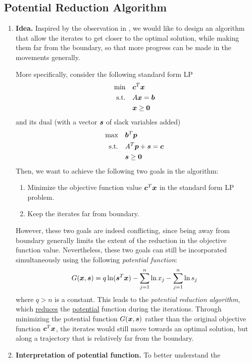 \subsection{Potential Reduction Algorithm}
\begin{enumerate}
\item \textbf{Idea.} Inspired by the observation in
, we would like to design an algorithm
that allow the iterates to get closer to the optimal solution, while making
them far from the boundary, so that more progress can be made in the
movements generally.

More specifically, consider the following standard form LP
\begin{align*}
\text{min}\quad&\bm{c}^{T}\bm{x} \\
\text{s.t.}\quad&A\bm{x}=\bm{b} \\
&\bm{x}\ge \bm{0}
\end{align*}
and its dual (with a vector \(\bm{s}\) of slack variables added)
\begin{align*}
\text{max}\quad&\bm{b}^{T}\bm{p} \\
\text{s.t.}\quad&A^{T}\bm{p}+\bm{s}=\bm{c} \\
&\bm{s}\ge\bm{0}
\end{align*}
Then, we want to achieve the following two goals in the algorithm:
\begin{enumerate}
\item Minimize the objective function value \(\bm{c}^{T}\bm{x}\) in the
standard form LP problem.
\item Keep the iterates far from boundary.
\end{enumerate}
However, these two goals are indeed conflicting, since being away from boundary
generally limits the extent of the reduction in the objective function value.
Nevertheless, these two goals can still be incorporated simultaneously using
the following \emph{potential function}:
\[
G(\bm{x},\bm{s})=q\ln (\bm{s}^{T}\bm{x})-\sum_{j=1}^{n}\ln x_j
-\sum_{j=1}^{n}\ln s_j
\]
where \(q>n\) is a constant. This leads to the \emph{potential reduction
algorithm}, which \underline{reduces} the \underline{potential} function during
the iterations. Through minimizing the potential function
\(G(\bm{x},\bm{s})\) rather than the original objective function
\(\bm{c}^{T}\bm{x}\), the iterates would still move towards an
optimal solution, but along a trajectory that is relatively far from the
boundary.
\item \textbf{Interpretation of potential function.} To better understand the

\end{enumerate}

